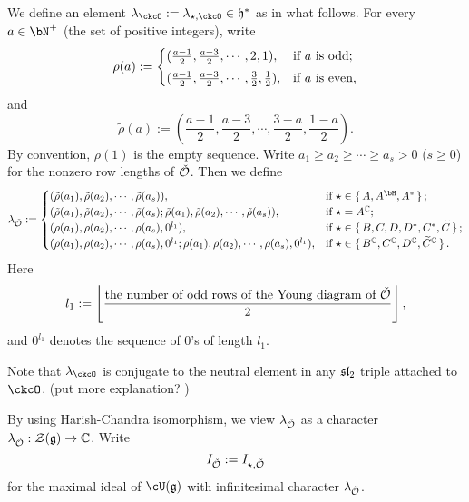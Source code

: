 \documentclass[counting_main.tex]{subfiles}
\begin{document}
 We define an element $\lambda_{\ckcO}:=\lambda_{\star, \ckcO} \in \h^*$ as in
 what follows. For every $a\in \bN^+$ (the set of positive integers), write
 \[
   \rho(a):=\begin{cases}
     (\frac{a-1}{2}, \frac{a-3}{2}, \cdots, 2,1),  &\textrm{if $a$ is odd;}\smallskip\\
     (\frac{a-1}{2}, \frac{a-3}{2}, \cdots, \frac{3}{2}, \frac{1}{2}), &\textrm{if $a$ is even,}\\
   \end{cases}
 \]
 and
 \[
   \tilde \rho(a):= (\frac{a-1}{2}, \frac{a-3}{2}, \cdots, \frac{3-a}{2},\frac{1-a}{2}).
 \]
 By convention, $\rho(1)$ is the empty sequence. Write
 $a_1\geq a_2\geq \cdots\geq a_s>0$ ($s\geq 0$) for the nonzero row lengths of
 $\check {{\mathcal {O}}}$. Then we define
 \[
   \lambda_{\check \CO}:= \begin{cases}
     (\tilde \rho( a_1), \tilde \rho(a_2),  \cdots, \tilde \rho(a_s)), & \text{if } \star \in \set{A, A^\bH, A^*};\\
     (\tilde \rho( a_1), \tilde \rho(a_2),  \cdots, \tilde \rho(a_s); \tilde \rho( a_1), \tilde \rho(a_2),  \cdots, \tilde \rho(a_s)), & \text{if } \star =A^\C;\\
     (\rho( a_1), \rho(a_2),  \cdots, \rho(a_s), 0^{l_1} ) , & \text{if } \star \in \set{B, C, D, D^*, C^*,\widetilde C};\\
     (\rho( a_1), \rho(a_2),  \cdots, \rho(a_s), 0^{l_1} ;  \rho( a_1), \rho(a_2),  \cdots, \rho(a_s), 0^{l_1} ) , & \text{if } \star \in \set{B^\C, C^\C, D^\C, \widetilde C^\C}.\\
   \end{cases}
 \]
 Here
 \[
   l_1:= \left\lfloor\frac{\textrm{the number of odd rows of the Young diagram
         of $\check {{\mathcal {O}}}$}}{2}\right\rfloor,
 \]
 and $0^{l_1}$ denotes the sequence of $0$'s of length $l_1$.

 Note that $\lambda_{\ckcO}$ is conjugate to the neutral element in any
 $\mathfrak{sl}_{2}$ triple attached to $\ckcO$. (put more explanation? )

 By using Harish-Chandra isomorphism, we view $\lambda_{\check {{\mathcal {O}}}}$ as a
 character $\lambda_{\check {{\mathcal {O}}}}: \mathcal Z(\mathfrak g)\rightarrow \mathbb{C}$. Write
 \[
   I_{\check {{\mathcal {O}}}}:=I_{\star, \check {{\mathcal {O}}}}
 \] for the maximal ideal of $\cU(\g)$ with infinitesimal character
 $\lambda_{\check {{\mathcal {O}}}}$.
\end{document}
